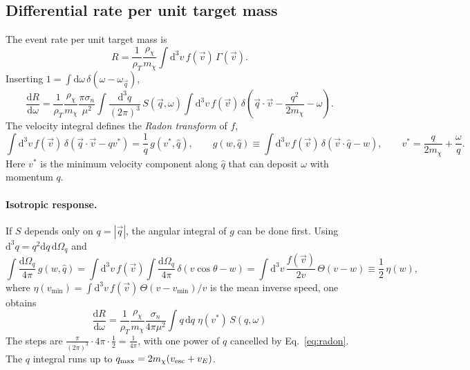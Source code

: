 \documentclass[11pt,a4paper]{article}
\numberwithin{equation}{section}
\newcommand{\qv}{\vec q}
\newcommand{\qh}{\hat q}
\newcommand{\dd}{\mathrm{d}}
\newcommand{\mchi}{m_\chi}
\begin{document}
\subsection{Differential rate per unit target mass}
The event rate per unit target mass is
\begin{equation}
  R = \frac{1}{\rho_T}\frac{\rho_\chi}{\mchi}\int \dd^3v\, f(\vec v)\,\Gamma(\vec v).
\end{equation}
Inserting $1=\int\dd\omega\,\delta(\omega-\omega_{\qv})$,
\begin{equation}
  \frac{\dd R}{\dd\omega} = \frac{1}{\rho_T}\frac{\rho_\chi}{\mchi}
  \frac{\pi\sigma_n}{\mu^2}\int\!\frac{\dd^3q}{(2\pi)^3}\,S(\qv,\omega)
  \int\dd^3v\, f(\vec v)\,
  \delta\!\left(\qv\cdot\vec v-\frac{q^2}{2\mchi}-\omega\right).
  \label{eq:dRdw_general}
\end{equation}
The velocity integral defines the \emph{Radon transform} of $f$,
\begin{equation}
  \int\dd^3v\, f(\vec v)\,\delta(\qv\cdot\vec v-q v^*)
  = \frac{1}{q}\, g(v^*,\qh),
  \qquad
  g(w,\qh)\equiv\int\dd^3v\, f(\vec v)\,\delta(\vec v\cdot\qh - w),
  \qquad
  v^* = \frac{q}{2\mchi}+\frac{\omega}{q}.
  \label{eq:radon}
\end{equation}
Here $v^*$ is the minimum velocity component along $\qh$ that can deposit $\omega$ with
momentum $q$.

\paragraph{Isotropic response.}
If $S$ depends only on $q=|\qv|$, the angular integral of $g$ can be done first. Using
$\dd^3q = q^2\dd q\,\dd\Omega_q$ and
\begin{equation}
  \int\frac{\dd\Omega_q}{4\pi}\, g(w,\qh)
  = \int\dd^3v\, f(\vec v)\int\frac{\dd\Omega_q}{4\pi}\,\delta(v\cos\theta - w)
  = \int\dd^3v\,\frac{f(\vec v)}{2v}\,\Theta(v-w)
  \equiv \frac12\,\eta(w),
  \label{eq:g_to_eta}
\end{equation}
where $\eta(v_{\min})=\int\dd^3v\,f(\vec v)\,\Theta(v-v_{\min})/v$ is the mean inverse speed,
one obtains
\begin{equation}
  \boxed{\;
  \frac{\dd R}{\dd\omega} = \frac{1}{\rho_T}\frac{\rho_\chi}{\mchi}
  \frac{\sigma_n}{4\pi\mu^2}\int q\,\dd q\;\eta(v^*)\,S(q,\omega)\;}
  \label{eq:dRdw}
\end{equation}
The steps are
$\frac{\pi}{(2\pi)^3}\cdot 4\pi\cdot\frac{1}{2}=\frac{1}{4\pi}$, with one power of $q$
cancelled by Eq.~\eqref{eq:radon}. The $q$ integral runs up to
$q_{\max}=2\mchi(v_{\rm esc}+v_E)$.
\end{document}

